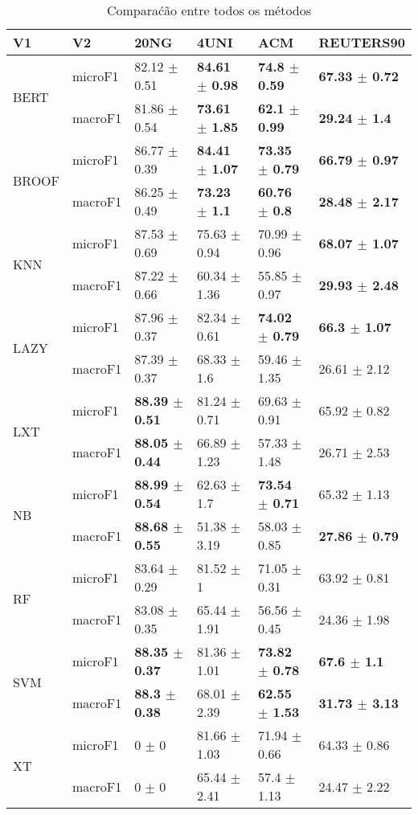 \documentclass[]{article}
\begin{document}
\begin{table}[ht]
\centering
\begin{tabular}{llllll}
  \hline
V1 & V2 & 20NG & 4UNI & ACM & REUTERS90 \\ 
  \cline{3-6} \hline
\multirow{2}{*}{BERT} & microF1 & 82.12 $\pm$  0.51 & \bf{84.61 $\pm$  0.98} & \bf{74.8 $\pm$  0.59} & \bf{67.33 $\pm$  0.72} \\ 
   & macroF1 & 81.86 $\pm$  0.54 & \bf{73.61 $\pm$  1.85} & \bf{62.1 $\pm$  0.99} & \bf{29.24 $\pm$  1.4} \\ 
   \cline{3-6}\multirow{2}{*}{BROOF} & microF1 & 86.77 $\pm$  0.39 & \bf{84.41 $\pm$  1.07} & \bf{73.35 $\pm$  0.79} & \bf{66.79 $\pm$  0.97} \\ 
   & macroF1 & 86.25 $\pm$  0.49 & \bf{73.23 $\pm$  1.1} & \bf{60.76 $\pm$  0.8} & \bf{28.48 $\pm$  2.17} \\ 
   \cline{3-6}\multirow{2}{*}{KNN} & microF1 & 87.53 $\pm$  0.69 & 75.63 $\pm$  0.94 & 70.99 $\pm$  0.96 & \bf{68.07 $\pm$  1.07} \\ 
   & macroF1 & 87.22 $\pm$  0.66 & 60.34 $\pm$  1.36 & 55.85 $\pm$  0.97 & \bf{29.93 $\pm$  2.48} \\ 
   \cline{3-6}\multirow{2}{*}{LAZY} & microF1 & 87.96 $\pm$  0.37 & 82.34 $\pm$  0.61 & \bf{74.02 $\pm$  0.79} & \bf{66.3 $\pm$  1.07} \\ 
   & macroF1 & 87.39 $\pm$  0.37 & 68.33 $\pm$  1.6 & 59.46 $\pm$  1.35 & 26.61 $\pm$  2.12 \\ 
   \cline{3-6}\multirow{2}{*}{LXT} & microF1 & \bf{88.39 $\pm$  0.51} & 81.24 $\pm$  0.71 & 69.63 $\pm$  0.91 & 65.92 $\pm$  0.82 \\ 
   & macroF1 & \bf{88.05 $\pm$  0.44} & 66.89 $\pm$  1.23 & 57.33 $\pm$  1.48 & 26.71 $\pm$  2.53 \\ 
   \cline{3-6}\multirow{2}{*}{NB} & microF1 & \bf{88.99 $\pm$  0.54} & 62.63 $\pm$  1.7 & \bf{73.54 $\pm$  0.71} & 65.32 $\pm$  1.13 \\ 
   & macroF1 & \bf{88.68 $\pm$  0.55} & 51.38 $\pm$  3.19 & 58.03 $\pm$  0.85 & \bf{27.86 $\pm$  0.79} \\ 
   \cline{3-6}\multirow{2}{*}{RF} & microF1 & 83.64 $\pm$  0.29 & 81.52 $\pm$  1 & 71.05 $\pm$  0.31 & 63.92 $\pm$  0.81 \\ 
   & macroF1 & 83.08 $\pm$  0.35 & 65.44 $\pm$  1.91 & 56.56 $\pm$  0.45 & 24.36 $\pm$  1.98 \\ 
   \cline{3-6}\multirow{2}{*}{SVM} & microF1 & \bf{88.35 $\pm$  0.37} & 81.36 $\pm$  1.01 & \bf{73.82 $\pm$  0.78} & \bf{67.6 $\pm$  1.1} \\ 
   & macroF1 & \bf{88.3 $\pm$  0.38} & 68.01 $\pm$  2.39 & \bf{62.55 $\pm$  1.53} & \bf{31.73 $\pm$  3.13} \\ 
   \cline{3-6}\multirow{2}{*}{XT} & microF1 & 0 $\pm$  0 & 81.66 $\pm$  1.03 & 71.94 $\pm$  0.66 & 64.33 $\pm$  0.86 \\ 
   & macroF1 & 0 $\pm$  0 & 65.44 $\pm$  2.41 & 57.4 $\pm$  1.13 & 24.47 $\pm$  2.22 \\ 
   \cline{3-6}\end{tabular}
\caption{Comparaćão entre todos os métodos} 
\end{table}
\end{document}
